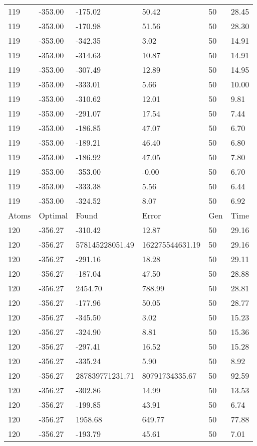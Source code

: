 \documentclass{report}
\begin{document}
\begin{appendix}
\begin{longtable}{llllll}
119 & -353.00 & -175.02 & 50.42 & 50 & 28.45 \\
119 & -353.00 & -170.98 & 51.56 & 50 & 28.30 \\
119 & -353.00 & -342.35 & 3.02 & 50 & 14.91 \\
119 & -353.00 & -314.63 & 10.87 & 50 & 14.91 \\
119 & -353.00 & -307.49 & 12.89 & 50 & 14.95 \\
119 & -353.00 & -333.01 & 5.66 & 50 & 10.00 \\
119 & -353.00 & -310.62 & 12.01 & 50 & 9.81 \\
119 & -353.00 & -291.07 & 17.54 & 50 & 7.44 \\
119 & -353.00 & -186.85 & 47.07 & 50 & 6.70 \\
119 & -353.00 & -189.21 & 46.40 & 50 & 6.80 \\
119 & -353.00 & -186.92 & 47.05 & 50 & 7.80 \\
119 & -353.00 & -353.00 & -0.00 & 50 & 6.70 \\
119 & -353.00 & -333.38 & 5.56 & 50 & 6.44 \\
119 & -353.00 & -324.52 & 8.07 & 50 & 6.92 \\
Atoms & Optimal & Found & Error & Gen & Time \\
120 & -356.27 & -310.42 & 12.87 & 50 & 29.16 \\
120 & -356.27 & 578145228051.49 & 162275544631.19 & 50 & 29.16 \\
120 & -356.27 & -291.16 & 18.28 & 50 & 29.11 \\
120 & -356.27 & -187.04 & 47.50 & 50 & 28.88 \\
120 & -356.27 & 2454.70 & 788.99 & 50 & 28.81 \\
120 & -356.27 & -177.96 & 50.05 & 50 & 28.77 \\
120 & -356.27 & -345.50 & 3.02 & 50 & 15.23 \\
120 & -356.27 & -324.90 & 8.81 & 50 & 15.36 \\
120 & -356.27 & -297.41 & 16.52 & 50 & 15.28 \\
120 & -356.27 & -335.24 & 5.90 & 50 & 8.92 \\
120 & -356.27 & 287839771231.71 & 80791734335.67 & 50 & 92.59 \\
120 & -356.27 & -302.86 & 14.99 & 50 & 13.53 \\
120 & -356.27 & -199.85 & 43.91 & 50 & 6.74 \\
120 & -356.27 & 1958.68 & 649.77 & 50 & 77.88 \\
120 & -356.27 & -193.79 & 45.61 & 50 & 7.01 \\

\end{longtable}
\end{appendix}
\end{document}
